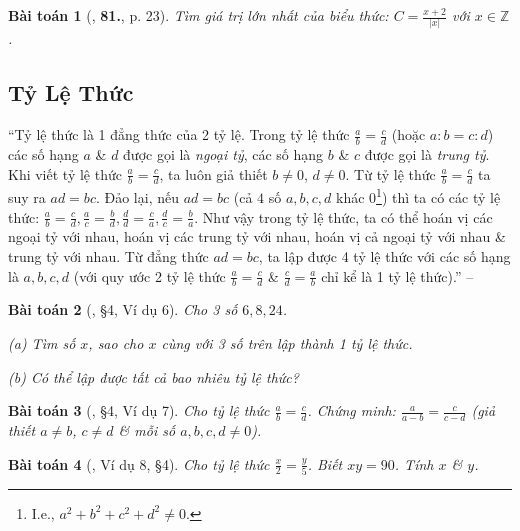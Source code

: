 \documentclass{article}
\numberwithin{equation}{section}
\newtheorem{baitoan}{Bài toán}
\begin{document}
\begin{baitoan}[\cite{Binh_Toan_7_tap_1}, \textbf{81.}, p. 23]
	Tìm giá trị lớn nhất của biểu thức: $C = \frac{x + 2}{|x|}$ với $x\in\mathbb{Z}$.
\end{baitoan}


\subsection{Tỷ Lệ Thức}
``Tỷ lệ thức là 1 đẳng thức của 2 tỷ lệ. Trong tỷ lệ thức $\frac{a}{b} = \frac{c}{d}$ (hoặc $a:b = c:d$) các số hạng $a$ \& $d$ được gọi là \textit{ngoại tỷ}, các số hạng $b$ \& $c$ được gọi là \textit{trung tỷ}. Khi viết tỷ lệ thức $\frac{a}{b} = \frac{c}{d}$, ta luôn giả thiết $b\ne 0$, $d\ne 0$. Từ tỷ lệ thức $\frac{a}{b} = \frac{c}{d}$ ta suy ra $ad = bc$. Đảo lại, nếu $ad = bc$ (cả $4$ số $a,b,c,d$ khác $0$\footnote{I.e., $a^2 + b^2 + c^2 + d^2\ne 0$.}) thì ta có các tỷ lệ thức: $\frac{a}{b} = \frac{c}{d},\frac{a}{c} = \frac{b}{d},\frac{d}{d} = \frac{c}{a},\frac{d}{c} = \frac{b}{a}$. Như vậy trong tỷ lệ thức, ta có thể hoán vị các ngoại tỷ với nhau, hoán vị các trung tỷ với nhau, hoán vị cả ngoại tỷ với nhau \& trung tỷ với nhau. Từ đẳng thức $ad = bc$, ta lập được 4 tỷ lệ thức với các số hạng là $a,b,c,d$ (với quy ước 2 tỷ lệ thức $\frac{a}{b} = \frac{c}{d}$ \& $\frac{c}{d} = \frac{a}{b}$ chỉ kể là 1 tỷ lệ thức).'' -- \cite[\S4]{Binh_Toan_7_tap_1}

\begin{baitoan}[\cite{Binh_Toan_7_tap_1}, \S4, Ví dụ 6]
	Cho 3 số $6,8,24$.
	\begin{enumerate*}
		\item[(a)] Tìm số $x$, sao cho $x$ cùng với 3 số trên lập thành 1 tỷ lệ thức.
		\item[(b)] Có thể lập được tất cả bao nhiêu tỷ lệ thức?
	\end{enumerate*}
\end{baitoan}

\begin{baitoan}[\cite{Binh_Toan_7_tap_1}, \S4, Ví dụ 7]
	Cho tỷ lệ thức $\frac{a}{b} = \frac{c}{d}$. Chứng minh: $\frac{a}{a - b} = \frac{c}{c - d}$ (giả thiết $a\ne b$, $c\ne d$ \& mỗi số $a,b,c,d\ne 0$).
\end{baitoan}

\begin{baitoan}[\cite{Binh_Toan_7_tap_1}, Ví dụ 8, \S4]
	Cho tỷ lệ thức $\frac{x}{2} = \frac{y}{5}$. Biết $xy = 90$. Tính $x$ \& $y$.
\end{baitoan}
\end{document}
